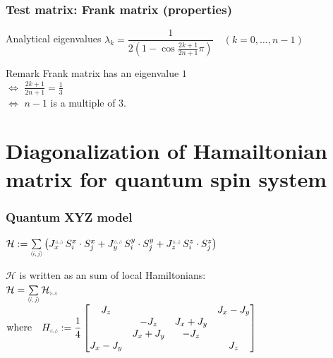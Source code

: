 \begin{frame}[c,fragile]
  \frametitle{Test matrix: Frank matrix (properties)}
\begin{block}{Analytical eigenvalues}%
$\lambda_k = \dfrac{1}{2 \left( 1 - \cos{\tfrac{2 k + 1}{2 n + 1}\pi} \right)} \quad (k=0,\dots,n-1)$
\end{block}

\begin{block}{Remark}%
Frank matrix has an eigenvalue $1$\\
\quad $\Longleftrightarrow$ $\tfrac{2 k + 1}{2 n + 1} = \tfrac{1}{3}$\\
\quad $\Longleftrightarrow$ $n-1$ is a multiple of 3.
\end{block}
\end{frame}




\section{Diagonalization of Hamailtonian matrix for quantum spin system}

\begin{frame}[c,fragile]
  \frametitle{Quantum XYZ model}
\setlength{\fboxsep}{1pt}

\noindent
$\mathcal{H}
 := \sum\limits_{\middlescr{{\langle i,j \rangle}}} \left(
  J_x^{\smallscr{\langle i,j \rangle}} \, S^x_i \cdot S^x_j
+ J_y^{\smallscr{\langle i,j \rangle}} \, S^y_i \cdot S^y_j
+ J_z^{\smallscr{\langle i,j \rangle}} \, S^z_i \cdot S^z_j
\right)$

\vspace{1\baselineskip}

\noindent
$\mathcal{H}$ is written as an sum of local Hamiltonians:\\
\noindent
$\mathcal{H} =
\sum\limits_{\middlescr{\langle i,j \rangle}}  \mathcal{H}_{\smallscr{\langle i,j \rangle}}$ \\
$\text{where} \quad  H_{\smallscr{\langle i,j \rangle}} :=
\dfrac{1}{4}
\begin{bmatrix}
J_z & & & J_x-J_y \\
 & - J_z & J_x+J_y & \\
 & J_x+J_y & - J_z & \\
J_x-J_y & & & J_z
\end{bmatrix}$

\end{frame}

\lstset{escapechar=\#}

